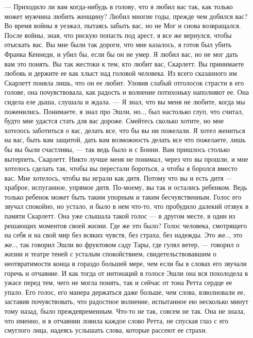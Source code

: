 — Приходило ли вам когда-нибудь в голову, что я любил вас так, как только может мужчина любить женщину? Любил многие годы, прежде чем добился вас? Во время войны я уезжал, пытаясь забыть вас, но не Мог и снова возвращался. После войны, зная, что рискую попасть под арест, я все же вернулся, чтобы отыскать вас. Вы мне были так дороги, что мне казалось, я готов был убить Франка Кеннеди, и убил бы, если бы он не умер. Я любил вас, но не мог дать вам это понять. Вы так жестоки к тем, кто любит вас, Скарлетт. Вы принимаете любовь и держите ее как хлыст над головой человека.
Из всего сказанного им Скарлетт поняла лишь, что он ее любит. Уловив слабый отголосок страсти в его голове, она почувствовала, как радость и волнение потихоньку наполняют ее. Она сидела еле дыша, слушала и ждала.
— Я знал, что вы меня не любите, когда мы поженились. Понимаете, я знал про Эшли, но.., был настолько глуп, что считал, будто мне удастся стать для вас дороже. Смейтесь сколько хотите, но мне хотелось заботиться о вас, делать все, что бы вы ни пожелали. Я хотел жениться на вас, быть вам защитой, дать вам возможность делать все что пожелаете, лишь бы вы были счастливы, — так ведь было и с Бонни. Вам пришлось столько вытерпеть, Скарлетт. Никто лучше меня не понимал, через что вы прошли, и мне хотелось сделать так, чтобы вы перестали бороться, а чтобы я боролся вместо вас. Мне хотелось, чтобы вы играли как дитя. Потому что вы и есть дитя — храброе, испуганное, упрямое дитя. По-моему, вы так и остались ребенком. Ведь только ребенок может быть таким упорным и таким бесчувственным.
Голос его звучал спокойно, но устало, и было в нем что-то, что пробудило далекий отзвук в памяти Скарлетт. Она уже слышала такой голос — в другом месте, в один из решающих моментов своей жизни. Где же это было? Голос человека, смотрящего на себя и на свой мир без всяких чувств, без страха, без надежды.
Это же.., это же.., так говорил Эшли во фруктовом саду Тары, где гулял ветер, — говорил о жизни и театре теней с усталым спокойствием, свидетельствовавшим о неотвратимости конца в гораздо большей мере, чем если бы в словах его звучали горечь и отчаяние. И как тогда от интонаций в голосе Эшли она вся похолодела в ужасе перед тем, чего не могла понять, так и сейчас от тона Ретта сердце ее упало. Его голос, его манера держаться даже больше, чем слова, взволновали ее, заставив почувствовать, что радостное волнение, испытанное ею несколько минут тому назад, было преждевременным. Что-то не так, совсем не так. Она не знала, что именно, и в отчаянии ловила каждое слово Ретта, не спуская глаз с его смуглого лица, надеясь услышать слова, которые рассеют ее страхи.

